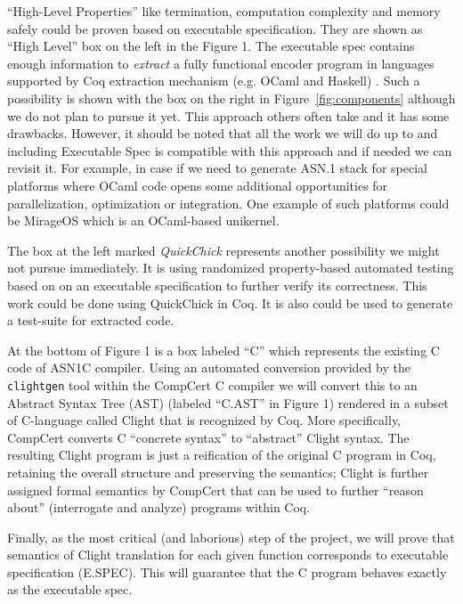 \documentclass[acmsmall,nonacm]{acmart}
\begin{document}
``High-Level Properties'' like termination, computation complexity and
memory safely could be proven based on executable specification. They
are shown as ``High Level'' box on the left in the Figure 1. The executable spec
contains enough information to \textit{extract} a fully functional
encoder program in languages supported by Coq extraction mechanism
(e.g. OCaml and Haskell) \cite{Extraction}. Such a possibility is shown with the box
on the right in Figure~\ref{fig:components} although we do not plan to
pursue it yet. This approach others often take and it has some
drawbacks. However, it should be noted that all the work we will do up
to and including Executable Spec is compatible with this approach and
if needed we can revisit it. For example, in case if we need to
generate ASN.1 stack for special platforms where OCaml code opens some
additional opportunities for parallelization, optimization or
integration. One example of such platforms could be MirageOS
\cite{MirageOS} which is an OCaml-based unikernel.

The box at the left marked \textit{QuickChick} represents another
possibility we might not pursue immediately. It is using randomized
property-based automated testing based on on an executable
specification to further verify its correctness. This work could be
done using QuickChick \cite{QuickChick} in Coq. It is also could be used
to generate a test-suite for extracted code.

At the bottom of Figure 1 is a box labeled ``C'' which represents the
existing C code of ASN1C compiler. Using an automated conversion
provided by the \texttt{clightgen} tool within the CompCert C compiler
\cite{CompCert} we will convert this to an Abstract Syntax Tree (AST)
\cite{AST} (labeled ``C.AST'' in Figure 1) rendered in a subset
of C-language called Clight \cite{Mechanized} that is recognized by Coq. More specifically,
CompCert converts C ``concrete syntax'' to ``abstract'' Clight
syntax. The resulting Clight program is just a reification of the
original C program in Coq, retaining the overall structure and
preserving the semantics; Clight is further assigned formal semantics
by CompCert that can be used to further ``reason about'' (interrogate
and analyze) programs within Coq.

Finally, as the most critical (and laborious) step of the project, we
will prove that semantics of Clight
translation for each given function corresponds to executable
specification (E.SPEC). This will guarantee that the C program behaves exactly
as the executable spec.
\end{document}
